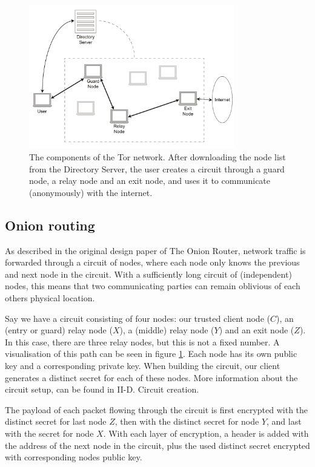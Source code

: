 \documentclass{article}
\begin{document}
	\begin{figure}[!t]
		\centering
		\includegraphics[width=0.8\textwidth]{graphics/tor.pdf}
		\caption{The components of the Tor network. After downloading the node list from the Directory Server, the user creates a circuit through a guard node, a relay node and an exit node, and uses it to communicate (anonymously) with the internet.}
		\label{fig:tor_layout}
	\end{figure}

	\subsection{Onion routing}
		As described in the original design paper of The Onion Router, network traffic is forwarded through a circuit of nodes, where each node only knows the previous and next node in the circuit. With a sufficiently long circuit of (independent) nodes, this means that two communicating parties can remain oblivious of each others physical location.
					
		Say we have a circuit consisting of four nodes: our trusted client node ($C$), an (entry or guard) relay node ($X$), a (middle) relay node ($Y$) and an exit node ($Z$). In this case, there are three relay nodes, but this is not a fixed number. A visualisation of this path can be seen in figure \ref{fig:tor_layout}. Each node has its own public key and a corresponding private key. When building the circuit, our client generates a distinct secret for each of these nodes. More information about the circuit setup, can be found in II-D. Circuit creation.
					
		The payload of each packet flowing through the circuit is first encrypted with the distinct secret for last node $Z$, then with the distinct secret for node $Y$, and last with the secret for node $X$. With each layer of encryption, a header is added with the address of the next node in the circuit, plus the used distinct secret encrypted with corresponding nodes public key. 
					
\end{document}
